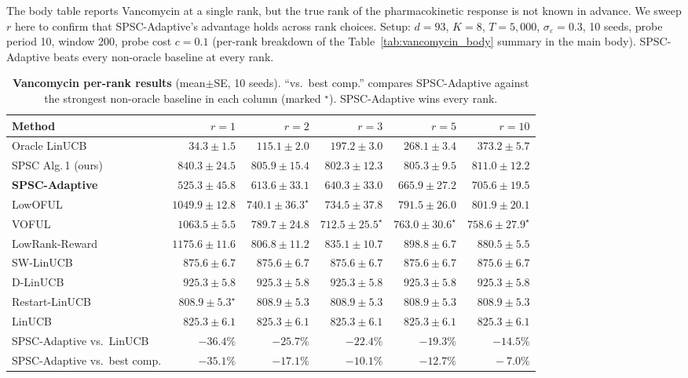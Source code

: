 \documentclass{article}
\begin{document}
The body table reports Vancomycin at a single rank, but the true
rank of the pharmacokinetic response is not known in advance. We
sweep $r$ here to confirm that SPSC-Adaptive's advantage holds
across rank choices. Setup: $d{=}93$, $K{=}8$, $T{=}5{,}000$,
$\sigma_\varepsilon{=}0.3$, 10 seeds, probe period 10, window 200,
probe cost $c{=}0.1$ (per-rank breakdown of the
Table~\ref{tab:vancomycin_body} summary in the main body).
SPSC-Adaptive beats every non-oracle baseline at every rank.

\begin{table}[!htbp]
\centering
\caption{\textbf{Vancomycin per-rank results} (mean$\pm$SE, 10
seeds). ``vs.\ best comp.'' compares SPSC-Adaptive against the
strongest non-oracle baseline in each column (marked $^\star$).
SPSC-Adaptive wins every rank.}
\label{tab:vancomycin_full}
\footnotesize
\setlength{\tabcolsep}{2pt}
\begin{tabular}{l@{\hskip 3pt}rrrrr}
\toprule
Method & $r{=}1$ & $r{=}2$ & $r{=}3$ & $r{=}5$ & $r{=}10$ \\
\midrule
Oracle LinUCB                & $34.3\pm 1.5$    & $115.1\pm 2.0$   & $197.2\pm 3.0$         & $268.1\pm 3.4$         & $373.2\pm 5.7$ \\
SPSC Alg.\,1 (ours)          & $840.3\pm 24.5$  & $805.9\pm 15.4$  & $802.3\pm 12.3$        & $805.3\pm 9.5$         & $811.0\pm 12.2$ \\
\textbf{SPSC-Adaptive}       & $\mathbf{525.3\pm 45.8}$ & $\mathbf{613.6\pm 33.1}$ & $\mathbf{640.3\pm 33.0}$ & $\mathbf{665.9\pm 27.2}$ & $\mathbf{705.6\pm 19.5}$ \\
LowOFUL                      & $1049.9\pm 12.8$ & $740.1\pm 36.3^\star$  & $734.5\pm 37.8$        & $791.5\pm 26.0$        & $801.9\pm 20.1$ \\
VOFUL                        & $1063.5\pm 5.5$  & $789.7\pm 24.8$  & $712.5\pm 25.5^\star$  & $763.0\pm 30.6^\star$  & $758.6\pm 27.9^\star$ \\
LowRank-Reward               & $1175.6\pm 11.6$ & $806.8\pm 11.2$  & $835.1\pm 10.7$        & $898.8\pm 6.7$         & $880.5\pm 5.5$ \\
SW-LinUCB                    & $875.6\pm 6.7$   & $875.6\pm 6.7$   & $875.6\pm 6.7$         & $875.6\pm 6.7$         & $875.6\pm 6.7$ \\
D-LinUCB                     & $925.3\pm 5.8$   & $925.3\pm 5.8$   & $925.3\pm 5.8$         & $925.3\pm 5.8$         & $925.3\pm 5.8$ \\
Restart-LinUCB               & $808.9\pm 5.3^\star$ & $808.9\pm 5.3$ & $808.9\pm 5.3$         & $808.9\pm 5.3$         & $808.9\pm 5.3$ \\
LinUCB                       & $825.3\pm 6.1$   & $825.3\pm 6.1$   & $825.3\pm 6.1$         & $825.3\pm 6.1$         & $825.3\pm 6.1$ \\
\midrule
\multicolumn{1}{l}{SPSC-Adaptive vs.\ LinUCB}     & $-36.4\%$ & $-25.7\%$ & $-22.4\%$ & $-19.3\%$ & $-14.5\%$ \\
\multicolumn{1}{l}{SPSC-Adaptive vs.\ best comp.} & $-35.1\%$ & $-17.1\%$ & $-10.1\%$ & $-12.7\%$ & $\phantom{-}-7.0\%$ \\
\bottomrule
\end{tabular}
\end{table}
\end{document}
